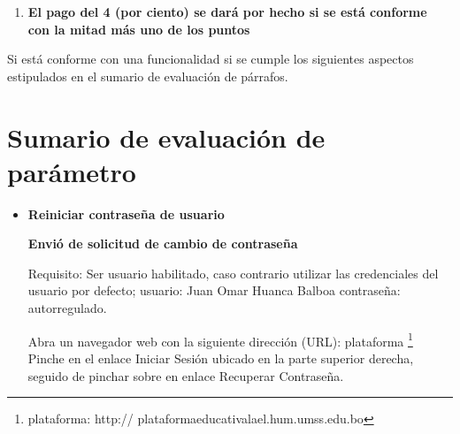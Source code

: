 \begin{enumerate}
\begin{itemize}
\end{itemize}

\item \textbf{El pago del 4 (por ciento) se dar\'{a} por hecho si se está conforme 
con la mitad más uno de los puntos}

\end{enumerate}

Si está conforme con una funcionalidad si se cumple los siguientes aspectos
estipulados en el sumario de evaluación de párrafos.

\section{Sumario de evaluación de parámetro}

\begin{itemize}

\item \textbf{Reiniciar contraseña de usuario}

\textbf{Envió de solicitud de cambio de contraseña}

Requisito: Ser usuario habilitado, caso contrario utilizar las credenciales del
usuario por defecto; usuario: Juan Omar Huanca Balboa contraseña: autorregulado.

Abra un navegador web con la siguiente dirección (URL): plataforma 
\footnote{plataforma: http:// plataformaeducativalael.hum.umss.edu.bo} Pinche en
el enlace Iniciar Sesión ubicado en la parte superior derecha, seguido de
pinchar sobre en enlace Recuperar Contraseña.


\end{itemize}
